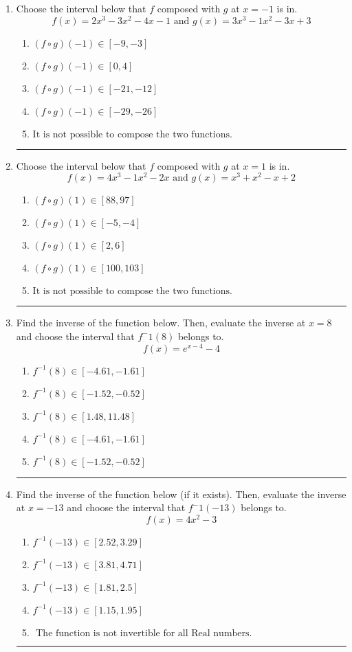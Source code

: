 \documentclass[14pt]{extbook}
\newcommand{\litem}[1]{\item#1\hspace*{-1cm}\rule{\textwidth}{0.4pt}}
\begin{document}
\begin{enumerate}
{\begin{enumerate}[label=\Alph*.]
\end{enumerate} }
\litem{
Choose the interval below that $f$ composed with $g$ at $x=-1$ is in.\[ f(x) = 2x^{3} -3 x^{2} -4 x -1 \text{ and } g(x) = 3x^{3} -1 x^{2} -3 x + 3 \]\begin{enumerate}[label=\Alph*.]
\item \( (f \circ g)(-1) \in [-9, -3] \)
\item \( (f \circ g)(-1) \in [0, 4] \)
\item \( (f \circ g)(-1) \in [-21, -12] \)
\item \( (f \circ g)(-1) \in [-29, -26] \)
\item \( \text{It is not possible to compose the two functions.} \)

\end{enumerate} }
\litem{
Choose the interval below that $f$ composed with $g$ at $x=1$ is in.\[ f(x) = 4x^{3} -1 x^{2} -2 x \text{ and } g(x) = x^{3} + x^{2} -x + 2 \]\begin{enumerate}[label=\Alph*.]
\item \( (f \circ g)(1) \in [88, 97] \)
\item \( (f \circ g)(1) \in [-5, -4] \)
\item \( (f \circ g)(1) \in [2, 6] \)
\item \( (f \circ g)(1) \in [100, 103] \)
\item \( \text{It is not possible to compose the two functions.} \)

\end{enumerate} }
\litem{
Find the inverse of the function below. Then, evaluate the inverse at $x = 8$ and choose the interval that $f^-1(8)$ belongs to.\[ f(x) = e^{x-4}-4 \]\begin{enumerate}[label=\Alph*.]
\item \( f^{-1}(8) \in [-4.61, -1.61] \)
\item \( f^{-1}(8) \in [-1.52, -0.52] \)
\item \( f^{-1}(8) \in [1.48, 11.48] \)
\item \( f^{-1}(8) \in [-4.61, -1.61] \)
\item \( f^{-1}(8) \in [-1.52, -0.52] \)

\end{enumerate} }
\litem{
Find the inverse of the function below (if it exists). Then, evaluate the inverse at $x = -13$ and choose the interval that $f^-1(-13)$ belongs to.\[ f(x) = 4 x^2 - 3 \]\begin{enumerate}[label=\Alph*.]
\item \( f^{-1}(-13) \in [2.52, 3.29] \)
\item \( f^{-1}(-13) \in [3.81, 4.71] \)
\item \( f^{-1}(-13) \in [1.81, 2.5] \)
\item \( f^{-1}(-13) \in [1.15, 1.95] \)
\item \( \text{ The function is not invertible for all Real numbers. } \)


\end{enumerate}}
\end{enumerate}
\end{document}
